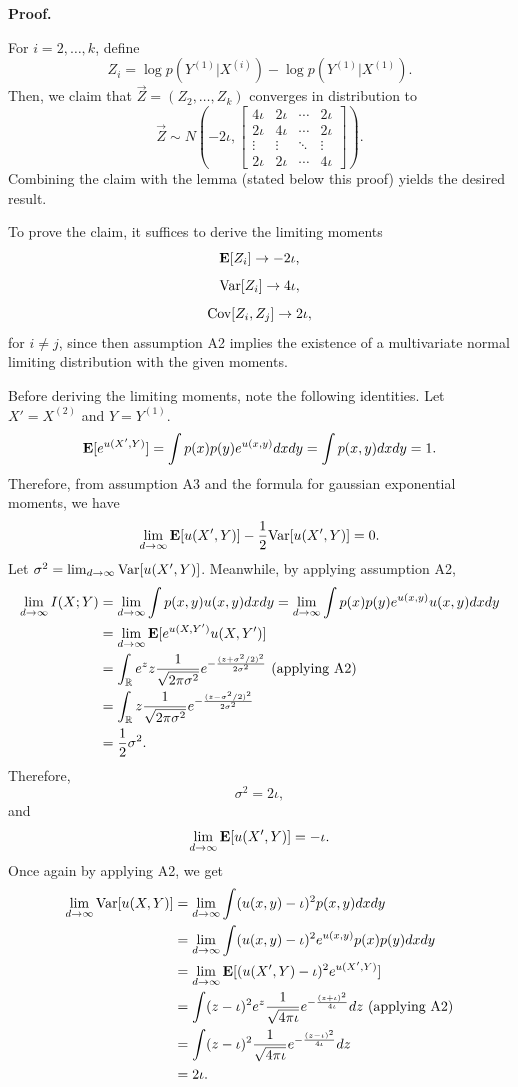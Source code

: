 \documentclass[12pt]{article}
\begin{document}

\textbf{Proof.}

For $i = 2,\hdots, k$, define
\[
Z_i = \log p(Y^{(1)}|X^{(i)}) - \log p(Y^{(1)}|X^{(1)}).
\]
Then, we claim that $\vec{Z} = (Z_2,\hdots, Z_k)$ converges in distribution to
\[
\vec{Z} \sim N\left(-2\iota, 
\begin{bmatrix}
4\iota & 2\iota & \cdots & 2\iota\\
2\iota & 4\iota & \cdots & 2\iota\\
\vdots & \vdots & \ddots & \vdots\\
2\iota & 2\iota & \cdots & 4\iota
\end{bmatrix}
\right).
\]
Combining the claim with the lemma (stated below this proof) yields the
desired result.

To prove the claim, it suffices to derive the limiting moments
\[\textbf{E}[Z_i] \to -2\iota,\]
\[\text{Var}[Z_i] \to 4\iota,\]
\[\text{Cov}[Z_i, Z_j] \to 2\iota,\]
for $i \neq j$,
since then assumption A2 implies the existence of a multivariate normal
limiting distribution with the given moments.

Before deriving the limiting moments, note the following identities.
Let $X' = X^{(2)}$ and $Y = Y^{(1)}$.
\[
\textbf{E}[e^{u(X', Y)}] = \int p(x) p(y) e^{u(x, y)} dx dy = \int p(x, y) dx dy = 1.
\]
Therefore, from assumption A3 and the formula for gaussian exponential
moments, we have
\[
\lim_{d \to \infty} \textbf{E}[u(X', Y)]-\frac{1}{2}\text{Var}[u(X', Y)] = 0.
\]
Let $\sigma^2 = \lim_{d \to \infty} \text{Var}[u(X', Y)]$.
Meanwhile, by applying assumption A2,
\begin{align*}
\lim_{d \to \infty} I(X; Y) &= \lim_{d \to \infty} \int p(x, y) u(x, y) dx dy 
= \lim_{d \to \infty} \int p(x) p(y) e^{u(x, y)} u(x, y) dx dy
\\&= \lim_{d \to \infty}  \textbf{E}[e^{u(X, Y')}u(X, Y')]
\\&= \int_{\mathbb{R}} e^z z \frac{1}{\sqrt{2\pi \sigma^2}} 
e^{-\frac{(z + \sigma^2/2)^2}{2\sigma^2}} \text{ (applying A2)}
\\&= \int_{\mathbb{R}} z \frac{1}{\sqrt{2\pi \sigma^2}} 
e^{-\frac{(z - \sigma^2/2)^2}{2\sigma^2}}
\\&= \frac{1}{2}\sigma^2.
\end{align*}
Therefore,
\[
\sigma^2 = 2\iota,
\]
and
\[
\lim_{d \to \infty} \textbf{E}[u(X', Y)] = -\iota.
\]
Once again by applying A2, we get
\begin{align*}
\lim_{d \to \infty} \text{Var}[u(X, Y)] 
&= \lim_{d \to \infty} \int (u(x, y) - \iota)^2 p(x, y) dx dy
\\&= \lim_{d \to \infty} \int (u(x, y) - \iota)^2 e^{u(x, y)} p(x) p(y) dx dy
\\&= \lim_{d \to \infty} \textbf{E}[(u(X', Y) - \iota)^2 e^{u(X', Y)}] 
\\&= \int (z - \iota)^2 e^z \frac{1}{\sqrt{4\pi\iota}} e^{-\frac{(z+\iota)^2}{4\iota}} dz \text{ (applying A2)}
\\&= \int (z - \iota)^2 \frac{1}{\sqrt{4\pi\iota}} e^{-\frac{(z-\iota)^2}{4\iota}} dz
\\&= 2\iota.
\end{align*}
\end{document}

